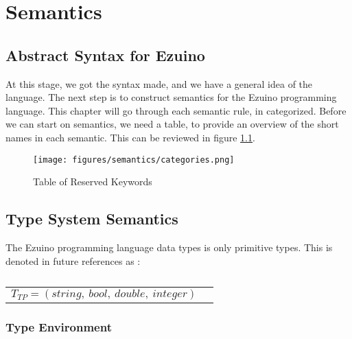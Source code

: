 \chapter{Semantics}
\label{semantics}
\section{Abstract Syntax for Ezuino}
At this stage, we got the syntax made, and we have a general idea of the language. The next step is to construct semantics for the Ezuino programming language. This chapter will go through each semantic rule, in categorized. 
Before we can start on semantics, we need a table, to provide an overview of the short names in each semantic. This can be  reviewed in figure \ref{semCat}.
\begin{figure}[H]
\centering
\texttt{[image: figures/semantics/categories.png]}
\caption{Table of Reserved Keywords}
\label{semCat}
\end{figure}


\section{Type System Semantics}
The Ezuino programming language data types is only primitive types. This is denoted in future references as :
\begin{table}[H]
    \centering
    \begin{longtable}[c] { r c }
      
        \( { T_{TP} = (string,\ bool,\ double,\ integer)} \) \\
    \end{longtable}
    \caption{}\label{s-empty}
\end{table}

\subsection{Type Environment}
